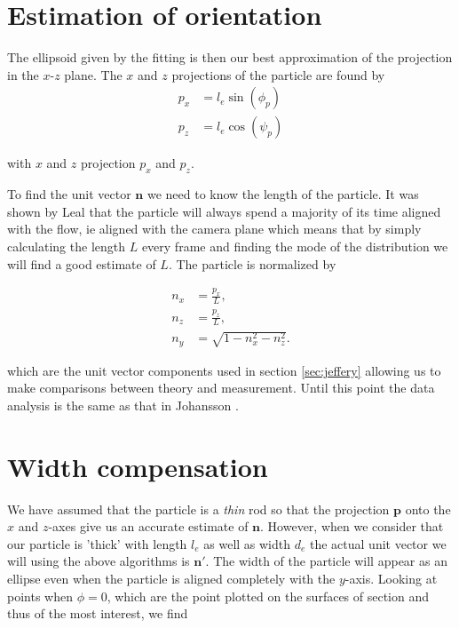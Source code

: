 \section{Estimation of orientation}

The ellipsoid given by the fitting is then our best approximation of the projection in the $x$-$z$ plane. The $x$ and $z$ projections of the particle are found by
\begin{align} \label{eq:project}
p_x  &= l_e \sin(\phi_p) \\
p_z  &= l_e \cos(\psi_p) 
\end{align}

with $x$ and $z$ projection $p_x$ and $p_z$. 

To find the unit vector $\mathbf{n}$ we need to know the length of the particle. It was shown by Leal \cite{Leal} that the particle will always spend a majority of its time aligned with the flow, ie aligned with the camera plane which means that by simply calculating the length $L$ every frame and finding the mode of the distribution we will find a good estimate of $L$. The particle is normalized by

\begin{subequations}\label{eq:normalize}
\begin{align}
n_x 	&= \frac{p_x}{L}, \\
n_z 	&= \frac{p_z}{L}, \\
n_y		&= \sqrt{1 - n_x^2 - n_z^2}.
\end{align}
\end{subequations}

which are the unit vector components used in section \ref{sec:jeffery} allowing us to make comparisons between theory and measurement. Until this point the data analysis is the same as that in Johansson \cite{AntonThesis}.

\section{Width compensation}\label{sec:width_compensation}
We have assumed that the particle is a \emph{thin} rod so that the projection $\mathbf{p}$ onto the $x$ and $z$-axes give us an accurate estimate of $\mathbf{n}$. However, when we consider that our particle is 'thick' with length $l_e$ as well as width $d_e$ the actual unit vector we will using the above algorithms is $\mathbf{n}'$. The width of the particle will appear as an ellipse even when the particle is aligned completely with the $y$-axis. Looking at points when $\phi = 0$, which are the point plotted on the surfaces of section and thus of the most interest, we find

